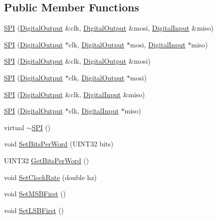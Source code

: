 \subsection*{\-Public \-Member \-Functions}
\begin{DoxyCompactItemize}
\item 
\hyperlink{classSPI_ab8a031abcb911915f2221324211f37b4}{\-S\-P\-I} (\hyperlink{classDigitalOutput}{\-Digital\-Output} \&clk, \hyperlink{classDigitalOutput}{\-Digital\-Output} \&mosi, \hyperlink{classDigitalInput}{\-Digital\-Input} \&miso)
\item 
\hyperlink{classSPI_a5a9ff16c1b36056d2bab48c8bb9dd58f}{\-S\-P\-I} (\hyperlink{classDigitalOutput}{\-Digital\-Output} $\ast$clk, \hyperlink{classDigitalOutput}{\-Digital\-Output} $\ast$mosi, \hyperlink{classDigitalInput}{\-Digital\-Input} $\ast$miso)
\item 
\hyperlink{classSPI_aa99a1d66d364cb0ec749026660fb8bd2}{\-S\-P\-I} (\hyperlink{classDigitalOutput}{\-Digital\-Output} \&clk, \hyperlink{classDigitalOutput}{\-Digital\-Output} \&mosi)
\item 
\hyperlink{classSPI_a8de2c7b9a8484df3e4588afa5ed47178}{\-S\-P\-I} (\hyperlink{classDigitalOutput}{\-Digital\-Output} $\ast$clk, \hyperlink{classDigitalOutput}{\-Digital\-Output} $\ast$mosi)
\item 
\hyperlink{classSPI_a1ff8fa9eb4cf60ec5238c5797651afec}{\-S\-P\-I} (\hyperlink{classDigitalOutput}{\-Digital\-Output} \&clk, \hyperlink{classDigitalInput}{\-Digital\-Input} \&miso)
\item 
\hyperlink{classSPI_a74dd16adaa9ca26845ebc2f8c61379fa}{\-S\-P\-I} (\hyperlink{classDigitalOutput}{\-Digital\-Output} $\ast$clk, \hyperlink{classDigitalInput}{\-Digital\-Input} $\ast$miso)
\item 
virtual \hyperlink{classSPI_a6babebf1ea3e8ff0330f43a3e2312ac4}{$\sim$\-S\-P\-I} ()
\item 
void \hyperlink{classSPI_af1d668c7056784c19d2d7b494e3c214a}{\-Set\-Bits\-Per\-Word} (\-U\-I\-N\-T32 bits)
\item 
\-U\-I\-N\-T32 \hyperlink{classSPI_a6dea6f0679df0018fd19b52f0bb06347}{\-Get\-Bits\-Per\-Word} ()
\item 
void \hyperlink{classSPI_a27b450354fc78eb4441e7d59f8fe65f2}{\-Set\-Clock\-Rate} (double hz)
\item 
void \hyperlink{classSPI_a66ed807d9a76400a74e815837b3ff32b}{\-Set\-M\-S\-B\-First} ()
\item 
void \hyperlink{classSPI_acd12e6ca307ec0dc0fb80f4cc9aa6ee3}{\-Set\-L\-S\-B\-First} ()

\end{DoxyCompactItemize}
